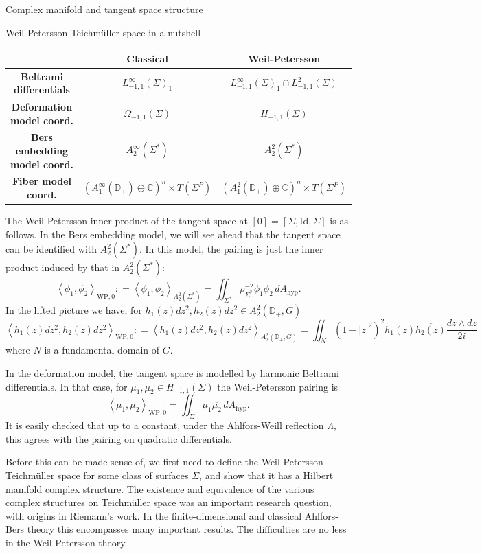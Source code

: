 \documentclass[12pt]{amsart}
\newcommand{\disk}{\ensuremath{\mathbb{D}} } %
\newcommand{\riem}{\Sigma}  %
\theoremstyle{plain}
\theoremstyle{definition}
\theoremstyle{remark}
\numberwithin{equation}{section} %
\numberwithin{figure}{section} %
\begin{document}
\begin{section}{Complex manifold and tangent space structure}
\begin{subsection}{Weil-Petersson Teichm\"uller space in a nutshell}
 \begin{center}
\begin{tabular}{||c || c | c ||} 
 \hline 
 & {\bf Classical} & {\bf Weil-Petersson}  \\ [0.5ex] 
 \hline\hline
  {\bf Beltrami differentials} & $L^\infty_{-1,1}(\riem)_1 $ & $L^\infty_{-1,1}(\riem)_1 \cap L^2_{-1,1}(\riem)$    \\ [1ex] 
 \hline
   {\bf Deformation model coord.}  & $\Omega_{-1,1}(\riem)$ & $H_{-1,1}(\riem)$    \\  [1ex] 
 \hline 
 {\bf Bers embedding model coord.}  & $A_2^\infty(\riem^*)$ & $A_2^2(\riem^*)$  \\  [1ex] 
 \hline  
 {\bf Fiber model coord.} & $(A_1^\infty(\disk_+) \oplus \mathbb{C})^n \times T(\riem^P)$ & $(A_1^2(\disk_+) \oplus \mathbb{C})^n \times T(\riem^P)$   \\ [1ex] 
 \hline
\end{tabular}
\end{center}
 The Weil-Petersson inner product of the tangent space at $[0]=[\riem,\mathrm{Id},\riem]$ is as follows. In the Bers embedding model, we will see ahead that the tangent space can be identified with $A_2^2(\riem^*)$.  In this model, the pairing is just the inner product induced by that in $A_2^2(\riem^*)$: 
 \[   \left< \phi_1,\phi_2 \right>_{\mathrm{WP},0} : = \left< \phi_1,\phi_2 \right>_{A^2_2(\riem^*)} = \iint_{\riem^*} \rho_{\riem^*}^{-2} \phi_1 \overline{\phi_2} \, dA_{\mathrm{hyp}}. \] 
 In the lifted picture we have, for $h_1(z)dz^2,h_2(z)dz^2 \in A_2^2(\disk_+,G)$ 
 \[   \left< h_1(z)dz^2,h_2(z)dz^2 \right>_{\mathrm{WP},0} : =  \left< h_1(z)dz^2,h_2(z)dz^2 \right>_{A^2_2(\disk_+,G)} =  \iint_{N} (1-|z|^2)^2 h_1(z) \overline{h_2(z)} \frac{d\bar{z} \wedge dz}{2i} \] 
 where $N$ is a fundamental domain of $G$.  

 In the deformation model, the tangent space is modelled by harmonic Beltrami differentials. In that case, for $\mu_1,\mu_2 \in H_{-1,1}(\riem)$ the Weil-Petersson pairing is 
 \[   \left< \mu_1,\mu_2 \right>_{\mathrm{WP},0} = 
        \iint_{\riem} \mu_1 \overline{\mu_2} \, dA_{\mathrm{hyp}}.    \]
 It is easily checked that up to a constant, under the Ahlfors-Weill reflection $\Lambda$, this agrees with the pairing on quadratic differentials.  
 
 Before this can be made sense of, we first need to define the Weil-Petersson Teichm\"uller space for some class of surfaces $\riem$, and show that it has a Hilbert manifold complex structure. 
 The existence and equivalence of the various complex structures on Teichm\"uller space was an important research question, with origins in Riemann's work.  In the finite-dimensional and classical Ahlfors-Bers theory this encompasses many important results. The difficulties are no less in the Weil-Petersson theory.


\end{subsection}
\end{section}
\end{document}
